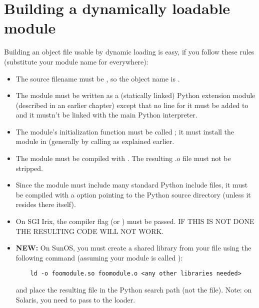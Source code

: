 \section{Building a dynamically loadable module}

Building an object file usable by dynamic loading is easy, if you
follow these rules (substitute your module name for 
everywhere):

\begin{itemize}

\item
The source filename must be , so the object
name is .

\item
The module must be written as a (statically linked) Python extension
module (described in an earlier chapter) except that no line for it
must be added to  and it mustn't be linked with the
main Python interpreter.

\item
The module's initialization function must be called ; it
must install the module in  (generally by calling
 as explained earlier.

\item
The module must be compiled with .  The resulting .o file must
not be stripped.

\item
Since the module must include many standard Python include files, it
must be compiled with a  option pointing to the Python source
directory (unless it resides there itself).

\item
On SGI Irix, the compiler flag  (or ) must be passed.
IF THIS IS NOT DONE THE RESULTING CODE WILL NOT WORK.

\item
{\bf NEW:} On SunOS, you must create a shared library from your 
file using the following command (assuming your module is called
):

\begin{verbatim}
	ld -o foomodule.so foomodule.o <any other libraries needed>
\end{verbatim}

and place the resulting  file in the Python search path (not
the  file).  Note: on Solaris, you need to pass  to
the loader.

\end{itemize}


